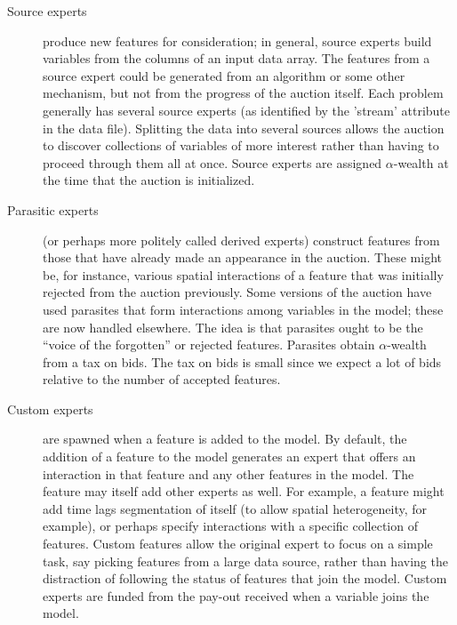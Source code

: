 \documentclass[12pt]{article}
\begin{document}
\begin{description}

\item[Source experts] produce new features for consideration; in general, source
 experts build variables from the columns of an input data array.  The features
 from a source expert could be generated from an algorithm or some other
 mechanism, but not from the progress of the auction itself.  Each problem
 generally has several source experts (as identified by the 'stream' attribute
 in the data file).  Splitting the data into several sources allows the auction
 to discover collections of variables of more interest rather than having to
 proceed through them all at once.  Source experts are assigned $\alpha$-wealth
 at the time that the auction is initialized.

\item[Parasitic experts] (or perhaps more politely called derived experts)
 construct features from those that have already made an appearance in the
 auction.  These might be, for instance, various spatial interactions of a
 feature that was initially rejected from the auction previously.  Some versions
 of the auction have used parasites that form interactions among variables in
 the model; these are now handled elsewhere.  The idea is that parasites ought
 to be the ``voice of the forgotten'' or rejected features.  Parasites obtain
 $\alpha$-wealth from a tax on bids.  The tax on bids is small since we expect a
 lot of bids relative to the number of accepted features.

\item[Custom experts] are spawned when a feature is added to the model.  By
 default, the addition of a feature to the model generates an expert that offers
 an interaction in that feature and any other features in the model.  The
 feature may itself add other experts as well.  For example, a feature might add
 time lags segmentation of itself (to allow spatial heterogeneity, for
 example), or perhaps specify interactions with a specific collection of
 features.  Custom features allow the original expert to focus on a simple task,
 say picking features from a large data source, rather than having the
 distraction of following the status of features that join the model.  Custom
 experts are funded from the pay-out received when a variable joins the model.


\end{description}
\end{document}
